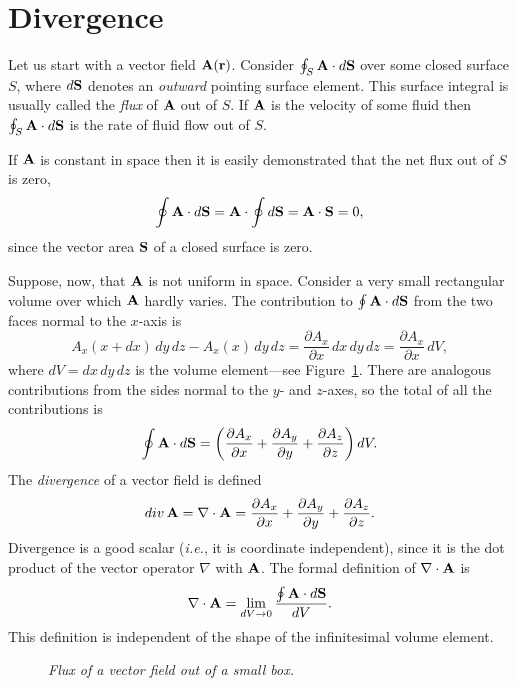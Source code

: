 \section{Divergence}
Let us start with a vector field ${\bf A}({\bf r})$. Consider $\oint_S {\bf A}\cdot
d{\bf S}$ over some closed surface $S$, where $d{\bf S}$ denotes an {\em outward}
pointing surface element. This surface integral is usually called the
{\em flux} of ${\bf A}$ out of $S$. If ${\bf A}$ is the velocity of some fluid
then $\oint_S {\bf A}\cdot d{\bf S}$ is the rate of fluid flow out of $S$. 

If ${\bf A}$ is constant in space then it is easily demonstrated that the net
flux out of $S$ is zero,
\begin{equation}
\oint {\bf A}\cdot d{\bf S} = {\bf A}\cdot \oint d{\bf S} = {\bf A} \cdot {\bf S}=0,
\end{equation}
since the vector area ${\bf S}$ of a closed surface is zero.

Suppose, now, that ${\bf A}$ is not uniform in space. Consider a very small 
rectangular volume over which ${\bf A}$ hardly varies. The contribution to
$\oint {\bf A}\cdot d{\bf S}$ from the two faces normal to the $x$-axis is
\begin{equation}
A_x(x+dx) \,dy\,dz - A_x(x)\, dy\,dz = \frac{\partial A_x}{\partial x}\,dx\,dy\,dz
=  \frac{\partial A_x}{\partial x}\,dV,
\end{equation}
where $dV= dx\,dy\,dz$ is the volume element---see Figure~\ref{f17}.
There are analogous contributions
from the sides normal to the $y$- and $z$-axes, so the total of all the contributions
 is
\begin{equation}\label{e2121}
\oint {\bf A}\cdot d{\bf S} = \left(\frac{\partial A_x}{\partial x}+
\frac{\partial A_y}{\partial y}+\frac{\partial A_z}{\partial z}\right)dV.
\end{equation}
The {\em divergence} of a vector field is defined
\begin{equation}
{\mit div}\,{\bf A} = \nabla\cdot {\bf A} = \frac{\partial A_x}{\partial x}
+\frac{\partial A_y}{\partial y}+\frac{\partial A_z}{\partial z}.
\end{equation}
Divergence  is a good scalar ({\em i.e.}, it is coordinate
 independent), 
since it is the dot product of
the vector operator $\nabla$ with ${\bf A}$. The formal definition of
$\nabla\cdot{\bf A}$ is
\begin{equation}
\nabla\cdot{\bf A} = \lim_{dV\rightarrow 0} \frac{\oint {\bf A}\cdot d{\bf S}}
{dV}.
\end{equation} 
This definition is independent of the shape of the  infinitesimal volume
element. 
\begin{figure}
\epsfysize=1.5in
\centerline{}
\caption{\em Flux of a vector field out of a small box.}\label{f17}
\end{figure}


